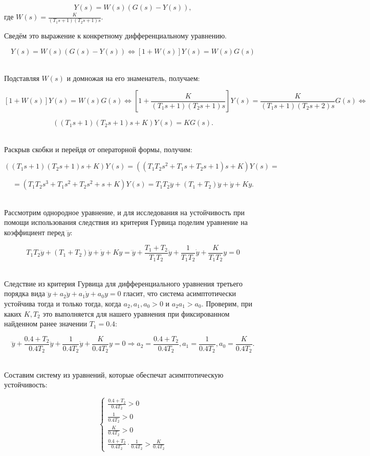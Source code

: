 \documentclass[a4paper]{article}
\begin{document}
$$
Y(s)=W(s)(G(s)-Y(s)),
$$
где $W(s) = \frac{K}{(T_1s+1)(T_2s+1)s}$.\

Сведём это выражение к конкретному дифференциальному уравнению.

$$
Y(s)=W(s)(G(s)-Y(s)) \Leftrightarrow [1+W(s)]Y(s)=W(s)G(s)
$$\

Подставляя $W(s)$ и домножая на его знаменатель, получаем:

$$
[1+W(s)]Y(s)=W(s)G(s) \Leftrightarrow \left[1 + \frac{K}{(T_1s+1)(T_2s+1)s}\right]Y(s)=\frac{K}{(T_1s+1)(T_2s+2)s}G(s) \Leftrightarrow
$$

$$
\left((T_1s+1)(T_2s+1)s + K\right)Y(s)=KG(s).
$$\

Раскрыв скобки и перейдя от операторной формы, получим:

$$
\left((T_1s+1)(T_2s+1)s + K\right)Y(s) = ((T_1T_2s^2+T_1s+T_2s+1)s + K)Y(s) =
$$

$$
= (T_1T_2s^3+T_1s^2+T_2s^2+s+K)Y(s) = T_1T_2\dddot{y} + (T_1 + T_2)\ddot{y} + \dot{y} + Ky.
$$\ 

Рассмотрим однородное уравнение, и для исследования на устойчивость при помощи использования следствия из критерия Гурвица поделим уравнение на коэффициент перед $\dddot{y}$:

$$
T_1T_2\dddot{y} + (T_1 + T_2)\ddot{y} + \dot{y} + Ky = \dddot{y}+\frac{T_1+T_2}{T_1T_2}\ddot{y} + \frac{1}{T_1T_2}\dot{y}+\frac{K}{T_1T_2}y = 0
$$\ 

Следствие из критерия Гурвица для дифференциального уравнения третьего порядка вида $\dddot{y}+a_2\ddot{y}+a_1\dot{y}+a_0y=0$ гласит, что система асимптотически устойчива тогда и только тогда, когда $a_2, a_1, a_0 > 0$ и $a_2a_1>a_0$. Проверим, при каких $K, T_2$ это выполняется для нашего уравнения при фиксированном найденном ранее значении $T_1 = 0.4$:

$$
\dddot{y}+\frac{0.4+T_2}{0.4T_2}\ddot{y} + \frac{1}{0.4T_2}\dot{y}+\frac{K}{0.4T_2}y = 0 \Rightarrow a_2 = \frac{0.4+T_2}{0.4T_2}, a_1 = \frac{1}{0.4T_2}, a_0 = \frac{K}{0.4T_2}.
$$\ 

Составим систему из уравнений, которые обеспечат асимптотическую устойчивость:

$$
\begin{cases}
    \frac{0.4 + T_2}{0.4T_2}>0 \\
    \frac{1}{0.4T_2}>0 \\
    \frac{K}{0.4T_2}>0\\
    \frac{0.4+T_2}{0.4T_2}\cdot\frac{1}{0.4T_2}>\frac{K}{0.4T_2}
\end{cases}
$$\ 
\end{document}
